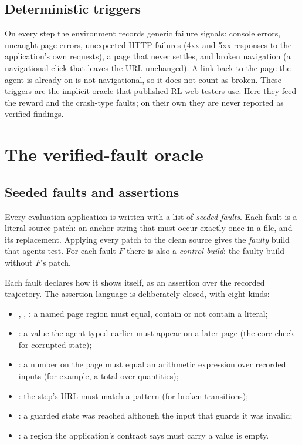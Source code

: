 \subsection{Deterministic triggers}

On every step the environment records generic failure signals: console errors, uncaught
page errors, unexpected HTTP failures (4xx and 5xx responses to the application's own
requests), a page that never settles, and broken navigation (a navigational click that
leaves the URL unchanged). A link back to the page the agent is already on is not
navigational, so it does not count as broken. These triggers are the implicit oracle that
published RL web testers use. Here they feed the reward and the crash-type faults; on their
own they are never reported as verified findings.

\section{The verified-fault oracle}
\label{sec:oracle}

\subsection{Seeded faults and assertions}

Every evaluation application is written with a list of \emph{seeded faults}. Each fault is
a literal source patch: an anchor string that must occur exactly once in a file, and its
replacement. Applying every patch to the clean source gives the \emph{faulty} build that
agents test. For each fault $F$ there is also a \emph{control build}: the faulty build
without $F$'s patch.

Each fault declares how it shows itself, as an assertion over the recorded trajectory. The
assertion language is deliberately closed, with eight kinds:

\begin{itemize}[noitemsep]
  \item {}, , : a named page region
        must equal, contain or not contain a literal;
  \item {}: a value the agent typed earlier must appear on a later page
        (the core check for corrupted state);
  \item {}: a number on the page must equal an arithmetic expression
        over recorded inputs (for example, a total over quantities);
  \item {}: the step's URL must match a pattern (for broken transitions);
  \item {}: a guarded state was reached although the input
        that guards it was invalid;
  \item {}: a region the application's contract says must carry a value is
        empty.
\end{itemize}

